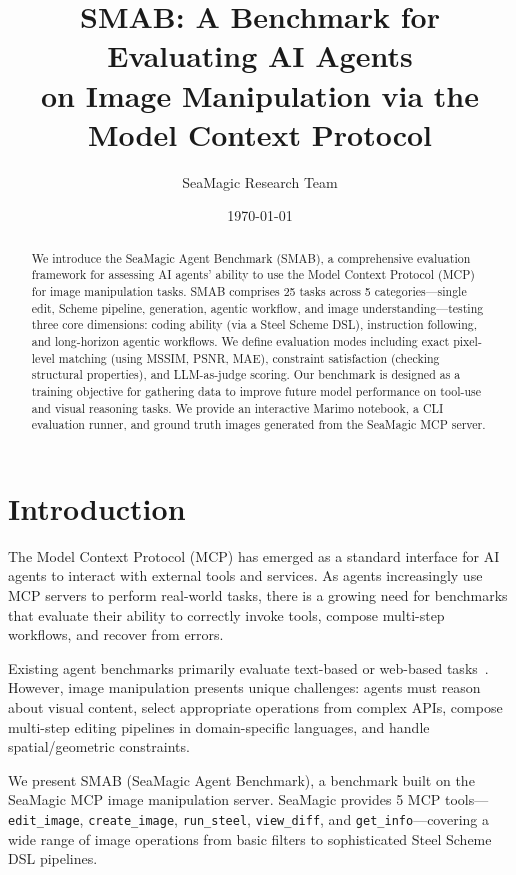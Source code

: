 \documentclass[11pt,a4paper]{article}
\title{SMAB: A Benchmark for Evaluating AI Agents\\on Image Manipulation via the Model Context Protocol}
\author{SeaMagic Research Team}
\date{\today}
\begin{document}
\maketitle

\begin{abstract}
We introduce the SeaMagic Agent Benchmark (SMAB), a comprehensive evaluation framework for assessing AI agents' ability to use the Model Context Protocol (MCP) for image manipulation tasks. SMAB comprises 25 tasks across 5 categories---single edit, Scheme pipeline, generation, agentic workflow, and image understanding---testing three core dimensions: coding ability (via a Steel Scheme DSL), instruction following, and long-horizon agentic workflows. We define evaluation modes including exact pixel-level matching (using MSSIM, PSNR, MAE), constraint satisfaction (checking structural properties), and LLM-as-judge scoring. Our benchmark is designed as a training objective for gathering data to improve future model performance on tool-use and visual reasoning tasks. We provide an interactive Marimo notebook, a CLI evaluation runner, and ground truth images generated from the SeaMagic MCP server.
\end{abstract}

\section{Introduction}

The Model Context Protocol (MCP) has emerged as a standard interface for AI agents to interact with external tools and services. As agents increasingly use MCP servers to perform real-world tasks, there is a growing need for benchmarks that evaluate their ability to correctly invoke tools, compose multi-step workflows, and recover from errors.

Existing agent benchmarks primarily evaluate text-based or web-based tasks~\citep{AgentBench, WebArena}. However, image manipulation presents unique challenges: agents must reason about visual content, select appropriate operations from complex APIs, compose multi-step editing pipelines in domain-specific languages, and handle spatial/geometric constraints.

We present SMAB (SeaMagic Agent Benchmark), a benchmark built on the SeaMagic MCP image manipulation server. SeaMagic provides 5 MCP tools---\texttt{edit\_image}, \texttt{create\_image}, \texttt{run\_steel}, \texttt{view\_diff}, and \texttt{get\_info}---covering a wide range of image operations from basic filters to sophisticated Steel Scheme DSL pipelines.
\end{document}
